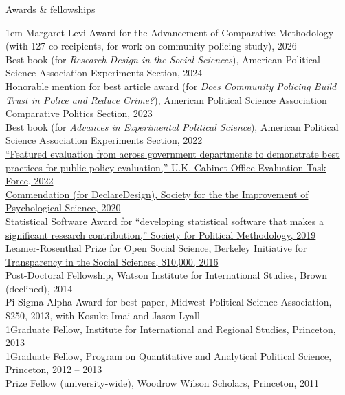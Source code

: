 \documentclass[10.9pt]{article}
\makeatletter
\newcommand\donotbreakhere{\par\nobreak\@afterheading\vspace{1em}}
\newcommand{\complete}{1}
\newenvironment{indnt}{\begin{adjustwidth}{1em}{}}{\end{adjustwidth}}
\makeatother
\begin{document}
{\large Awards \& fellowships}\donotbreakhere
\begin{indnt}
Margaret Levi Award for the Advancement of Comparative Methodology (with 127 co-recipients, for work on community policing study), 2026\\[0.75em]
Best book (for {\it Research Design in the Social Sciences}), American Political Science Association Experiments Section, 2024\\[0.75em]
Honorable mention for best article award (for {\it Does Community Policing Build Trust in Police and Reduce Crime?}), American Political Science Association Comparative Politics Section, 2023\\[0.75em]
Best book (for {\it Advances in Experimental Political Science}), American Political Science Association Experiments Section, 2022\\[0.75em]
\href{https://www.gov.uk/government/collections/top-evaluations-government}{``Featured evaluation from across government departments to demonstrate best practices for public policy evaluation,'' U.K. Cabinet Office Evaluation Task Force, 2022}\\[0.75em]
\href{https://improvingpsych.org/mission/awards/}{Commendation (for DeclareDesign), Society for the the Improvement of Psychological Science, 2020} \\[.75em]
\href{https://www.cambridge.org/core/membership/spm/about-us/awards/statistical-software-award}{Statistical Software Award for ``developing statistical software that makes a significant research contribution,'' Society for Political Methodology, 2019} \\[.75em]
\href{http://www.bitss.org/lr-prizes/}{Leamer-Rosenthal Prize for Open Social Science, Berkeley Initiative for Transparency in the Social Sciences, \$10,000, 2016}\\[.75em]
Post-Doctoral Fellowship, Watson Institute for International Studies, Brown (declined), 2014 \\[.75em]
Pi Sigma Alpha Award for best paper, Midwest Political Science Association, \$250, 2013, with Kosuke Imai and Jason Lyall\\[.75em]
\complete Graduate Fellow, Institute for International and Regional Studies, Princeton, 2013\\[.75em] \fi
{}\complete Graduate Fellow, Program on Quantitative and Analytical Political Science, Princeton, 2012 -- 2013\\[.75em] \fi
Prize Fellow (university-wide), Woodrow Wilson Scholars, Princeton, 2011 %
\end{indnt}
\vspace{1.5em}
\end{document}
